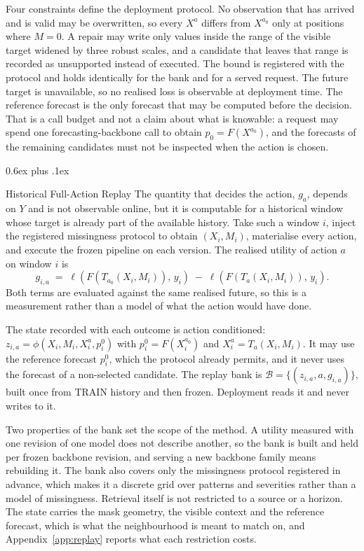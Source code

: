 \documentclass{article}
\makeatletter
\newcommand{\calB}{\mathcal{B}}
\newcommand{\loss}{\ell}
\def\subsection{\@startsection{subsection}{2}{\z@}{-1.4ex plus -0.4ex minus -.2ex}%
  {0.6ex plus .1ex}{\normalsize\sc\raggedright}}
\makeatother
\begin{document}
Four constraints define the deployment protocol. No observation that has arrived and is valid
may be overwritten, so every $X^{a}$ differs from $X^{a_0}$ only at positions where $M = 0$.
A repair may write only values inside the range of the visible target widened by three robust
scales, and a candidate that leaves that range is recorded as unsupported instead of executed.
The bound is registered with the protocol and holds identically for the bank and for a served
request. The future target is unavailable, so no realised loss is
observable at deployment time. The reference forecast is the only forecast that may be computed
before the decision. That is a call budget and not a claim about what is knowable: a
request may spend one forecasting-backbone call to obtain $p_0 = F(X^{a_0})$, and the forecasts
of the remaining candidates must not be inspected when the action is chosen.

\subsection{Historical Full-Action Replay}
\label{sec:method-replay}
The quantity that decides the action, $g_a$, depends on $Y$ and is not observable online, but it
is computable for a historical window whose target is already part of the available history.
Take such a window $i$, inject the registered missingness protocol to obtain $(X_i, M_i)$,
materialise every action, and execute the frozen pipeline on each version. The realised utility
of action $a$ on window $i$ is
\begin{equation}
  g_{i,a} \;=\; \loss\!\left(F(T_{a_0}(X_i, M_i)),\, y_i\right)
  \;-\; \loss\!\left(F(T_{a}(X_i, M_i)),\, y_i\right).
  \label{eq:replay-gain}
\end{equation}
Both terms are evaluated against the same realised future, so this is a measurement rather
than a model of what the action would have done.

The state recorded with each outcome is action conditioned:
$z_{i,a} = \phi(X_i, M_i, X_i^{a}, p_i^{0})$ with $p_i^{0} = F(X_i^{a_0})$ and
$X_i^{a} = T_a(X_i, M_i)$.\label{eq:state} It may use the reference forecast $p_i^0$, which the
protocol already permits, and it never uses the forecast of a non-selected candidate. The
replay bank is $\calB = \{(z_{i,a}, a, g_{i,a})\}$, built once from TRAIN history and then
frozen. Deployment reads it and never writes to it.

Two properties of the bank set the scope of the method. A utility measured with one revision
of one model does not describe another, so the bank is built and held per frozen backbone
revision, and serving a new backbone family means rebuilding it. The bank also covers only the
missingness protocol registered in advance, which makes it a discrete grid over patterns and
severities rather than a model of missingness. Retrieval itself is not restricted to a source
or a horizon. The state carries the mask geometry, the visible context and the reference
forecast, which is what the neighbourhood is meant to match on, and
Appendix~\ref{app:replay} reports what each restriction costs.
\end{document}
